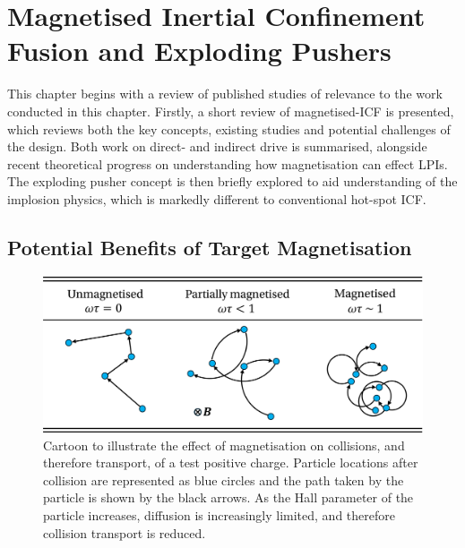 \newpage

\section{Magnetised Inertial Confinement Fusion and Exploding Pushers}%
\label{sec:Res2_MagICF}

This chapter begins with a review of published studies of relevance to the work conducted in this chapter.
Firstly, a short review of magnetised-\ac{ICF} is presented, which reviews both the key concepts, existing studies and potential challenges of the design.
Both work on direct- and indirect drive is summarised, alongside recent theoretical progress on understanding how magnetisation can effect \ac{LPIs}.
The exploding pusher concept is then briefly explored to aid understanding of the implosion physics, which is markedly different to conventional hot-spot \ac{ICF}.

\subsection{Potential Benefits of Target Magnetisation}%
\label{sec:Res2_magbenefits}

\begin{figure}[t!]
    \includegraphics[width=0.75\linewidth]{Results2/Images/wt_collisions.png}
    \centering
    \caption{Cartoon to illustrate the effect of magnetisation on collisions, and therefore transport, of a test positive charge.
    Particle locations after collision are represented as blue circles and the path taken by the particle is shown by the black arrows.
    As the Hall parameter of the particle increases, diffusion is increasingly limited, and therefore collision transport is reduced.}%
    \label{fig:Res2_omegatau}
\end{figure}

